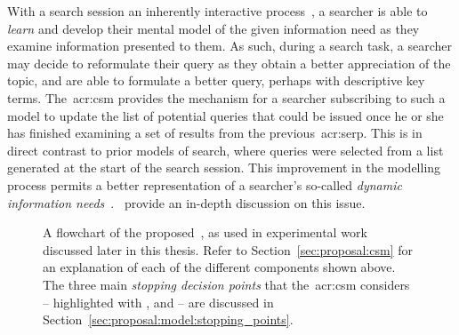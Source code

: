 \noindent
{} With a search session an inherently interactive process~\citep{ingwersen2005theturn}, a searcher is able to \emph{learn} and develop their mental model of the given information need as they examine information presented to them. As such, during a search task, a searcher may decide to reformulate their query as they obtain a better appreciation of the topic, and are able to formulate a better query, perhaps with descriptive key terms. The~\gls{acr:csm} provides the mechanism for a searcher subscribing to such a model to update the list of potential queries that could be issued once he or she has finished examining a set of results from the previous~\gls{acr:serp}. This is in direct contrast to prior models of search, where queries were selected from a list generated at the start of the search session. This improvement in the modelling process permits a better representation of a searcher's so-called \emph{dynamic information needs}~\citep{borlund2003iir_model}.~\cite{maxwell2016agents} provide an in-depth discussion on this issue.

\begin{figure}[t!]
    \centering
    \caption[The Complex Searcher Model]{A flowchart of the proposed~, as used in experimental work discussed later in this thesis. Refer to Section~\ref{sec:proposal:csm} for an explanation of each of the different components shown above. The three main \emph{stopping decision points} that the~\gls{acr:csm} considers – highlighted with ,  and  – are discussed in Section~\ref{sec:proposal:model:stopping_points}.}
    \label{fig:csm}
\end{figure}

